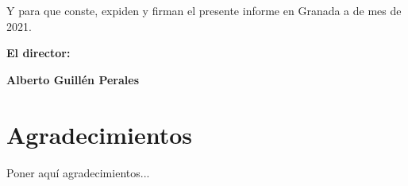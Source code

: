 \vspace{0.5cm}

Y para que conste, expiden y firman el presente informe en Granada a    de mes de 2021.

\vspace{1cm}

\textbf{El director:}

\vspace{5cm}

\noindent \textbf{Alberto Guillén Perales}

\chapter*{Agradecimientos}
\thispagestyle{empty}

       \vspace{1cm}


Poner aquí agradecimientos...

